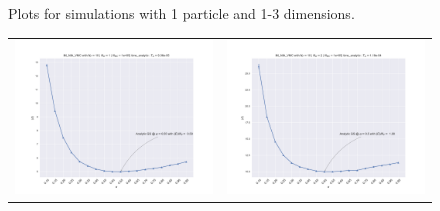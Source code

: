 \begin{figure}
\begin{tabular}{cc}
\end{tabular}
\caption{Plots for simulations with 1 particle and 1-3 dimensions.}
\label{fig:1c_1}
\end{figure}

\begin{figure}
\hspace{-2.8cm}
\begin{tabular}{cc}
\includegraphics[width = 0.5\paperwidth]{figures/c_figs/IM_NIA_np_10_nd_1.pdf} & \includegraphics[width = 0.5\paperwidth]{figures/c_figs/IM_NIA_np_10_nd_2.pdf} \\

\end{tabular}
\end{figure}
